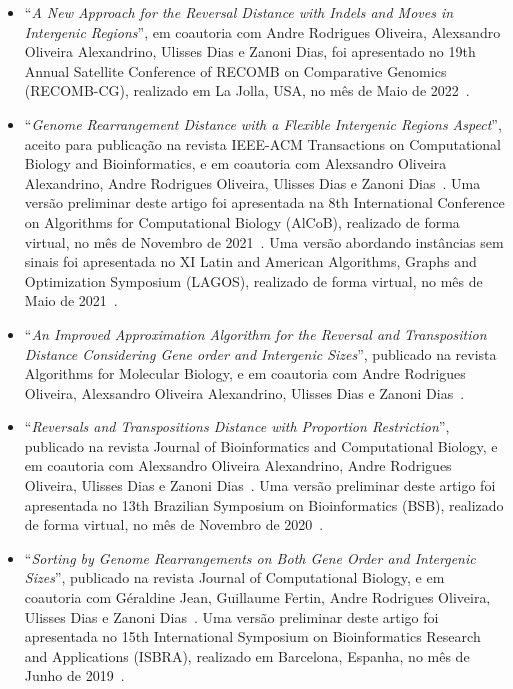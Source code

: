 \begin{itemize}
  \item ``\textit{A New Approach for the Reversal Distance with Indels and Moves in Intergenic Regions}'', em coautoria com Andre Rodrigues Oliveira, Alexsandro Oliveira Alexandrino, Ulisses Dias e Zanoni Dias, foi apresentado no 19th Annual Satellite Conference of RECOMB on Comparative Genomics (RECOMB-CG), realizado em La Jolla, USA, no mês de Maio de 2022~\cite{2022b-brito-etal}.

  \item ``\textit{Genome Rearrangement Distance with a Flexible Intergenic Regions Aspect}'', aceito para publicação na revista IEEE-ACM Transactions on Computational Biology and Bioinformatics, e em coautoria com Alexsandro Oliveira Alexandrino, Andre Rodrigues Oliveira, Ulisses Dias e Zanoni Dias~\cite{2022a-brito-etal}. Uma versão preliminar deste artigo foi apresentada na 8th International Conference on Algorithms for Computational Biology (AlCoB), realizado de forma virtual, no mês de Novembro de 2021~\cite{2021c-brito-etal}. Uma versão abordando instâncias sem sinais foi apresentada no XI Latin and American Algorithms, Graphs and Optimization Symposium (LAGOS), realizado de forma virtual, no mês de Maio de 2021~\cite{2021d-brito-etal}.

  \item ``\textit{An Improved Approximation Algorithm for the Reversal and Transposition Distance Considering Gene order and Intergenic Sizes}'', publicado na revista Algorithms for Molecular Biology, e em coautoria com Andre Rodrigues Oliveira, Alexsandro Oliveira Alexandrino, Ulisses Dias e Zanoni Dias~\cite{2021b-brito-etal}.

  \item ``\textit{Reversals and Transpositions Distance with Proportion Restriction}'', publicado na revista Journal of Bioinformatics and Computational Biology, e em coautoria com Alexsandro Oliveira Alexandrino, Andre Rodrigues Oliveira, Ulisses Dias e Zanoni Dias~\cite{2021a-brito-etal}. Uma versão preliminar deste artigo foi apresentada no 13th Brazilian Symposium on Bioinformatics (BSB), realizado de forma virtual, no mês de Novembro de 2020~\cite{2020c-brito-etal}.

  \item ``\textit{Sorting by Genome Rearrangements on Both Gene Order and Intergenic Sizes}'', publicado na revista Journal of Computational Biology, e em coautoria com Géraldine Jean, Guillaume Fertin, Andre Rodrigues Oliveira, Ulisses Dias e Zanoni Dias~\cite{2020a-brito-etal}. Uma versão preliminar deste artigo foi apresentada no 15th International Symposium on Bioinformatics Research and Applications (ISBRA), realizado em Barcelona, Espanha, no mês de Junho de 2019~\cite{2019-brito-etal}.
\end{itemize}


